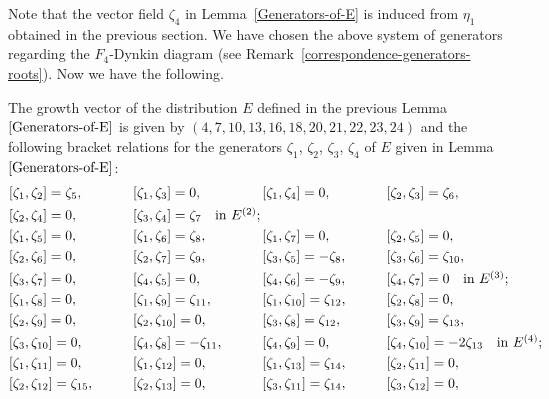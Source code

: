 Note that the vector field $\zeta_4$ in Lemma~\ref{Generators-of-E} is induced from $\eta_1$
obtained in the previous section. We have chosen the above system of generators regarding
the $F_4$-Dynkin diagram (see Remark~\ref{correspondence-generators-roots}).
Now we have the following.


\begin{Lemma}
\label{F_4-bracket-relations}
The growth vector of the distribution $E$ defined in the previous Lemma~$\ref{Generators-of-E}$
is given by $(4, 7, 10, 13, 16, 18, 20, 21, 22, 23, 24)$ and the following bracket relations for the generators
$\zeta_1$, $\zeta_2$, $\zeta_3$, $\zeta_4$ of $E$ given in Lemma~$\ref{Generators-of-E}$:
\begin{alignat*}{8}
&[\zeta_1, \zeta_2] = \zeta_5,\qquad&& [\zeta_1, \zeta_3] = 0,\qquad&& [\zeta_1, \zeta_4] = 0,\qquad&& [\zeta_2, \zeta_3] = \zeta_6,&\\
& [\zeta_2, \zeta_4] = 0,\qquad&& [\zeta_3, \zeta_4] = \zeta_7 \quad \makebox[0pt][l]{\text{in $E^{(2)}$;}}&
\\
&[\zeta_1, \zeta_5] = 0,\qquad&& [\zeta_1, \zeta_6] = \zeta_8,\qquad&& [\zeta_1, \zeta_7] = 0,\qquad&& [\zeta_2, \zeta_5] = 0,&\\
&
[\zeta_2, \zeta_6] = 0,\qquad&&[\zeta_2, \zeta_7] = \zeta_9,\qquad&&[\zeta_3, \zeta_5] = - \zeta_8,\qquad&& [\zeta_3, \zeta_6] = \zeta_{10},&\\
&[\zeta_3, \zeta_7] = 0,\qquad&& [\zeta_4, \zeta_5] = 0,\qquad&& [\zeta_4, \zeta_6] = - \zeta_9,\qquad&& [\zeta_4, \zeta_7] = 0 \quad \makebox[0pt][l]{\text{in $E^{(3)}$;}}&\\
&[\zeta_1, \zeta_8] = 0,\qquad&& [\zeta_1, \zeta_9] = \zeta_{11},\qquad&& [\zeta_1, \zeta_{10}] = \zeta_{12},\qquad&&
[\zeta_2, \zeta_8] = 0,&\\
& [\zeta_2, \zeta_9] = 0,\qquad&& [\zeta_2, \zeta_{10}] = 0,\qquad&& [\zeta_3, \zeta_8] = \zeta_{12},\qquad&&[\zeta_3, \zeta_9] = \zeta_{13},&
\\
&[\zeta_3, \zeta_{10}] = 0,\qquad&& [\zeta_4, \zeta_8] = - \zeta_{11},\qquad&& [\zeta_4, \zeta_9] = 0,\qquad&& [\zeta_4, \zeta_{10}] = - 2\zeta_{13} \quad \makebox[0pt][l]{\text{in $E^{(4)}$;}}&
\\
&[\zeta_1, \zeta_{11}] = 0,\qquad&& [\zeta_1, \zeta_{12}] = 0,\qquad&& [\zeta_1, \zeta_{13}] = \zeta_{14},\qquad&&
[\zeta_2, \zeta_{11}] = 0,& \\
&[\zeta_2, \zeta_{12}] = \zeta_{15},\qquad&& [\zeta_2, \zeta_{13}] = 0,\qquad&& [\zeta_3, \zeta_{11}] = \zeta_{14},\qquad&&[\zeta_3, \zeta_{12}] = 0,

\end{alignat*}
\end{Lemma}
